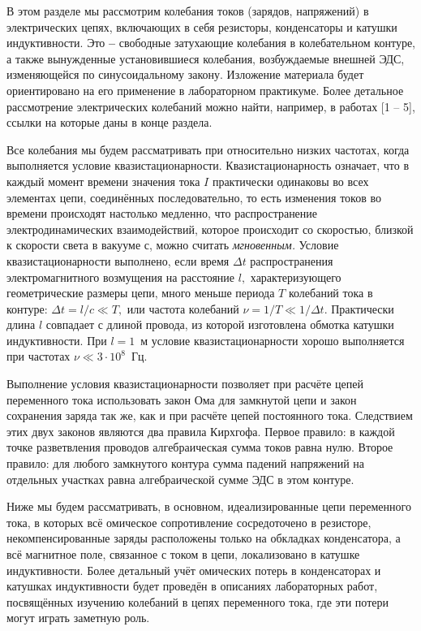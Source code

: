 В этом разделе мы рассмотрим колебания токов (зарядов, напряжений) в электрических цепях, включающих в себя резисторы, конденсаторы и катушки индуктивности. Это \textbf{--} свободные затухающие колебания в колебательном контуре, а также вынужденные установившиеся колебания, возбуждаемые внешней ЭДС, изменяющейся по синусоидальному закону. Изложение материала будет ориентировано на его применение в лабораторном практикуме. Более детальное рассмотрение электрических колебаний можно найти, например, в работах [1 – 5], ссылки на которые даны в конце раздела.

Все колебания мы будем рассматривать при относительно низких частотах, когда выполняется условие квазистационарности. Квазистационарность означает, что в каждый момент времени значения тока $I$ практически одинаковы во всех элементах цепи, соединённых последовательно, то есть изменения токов во времени происходят настолько медленно, что распространение электродинамических взаимодействий, которое происходит со скоростью, близкой к скорости света в вакууме $с$, можно считать \emph{мгновенным.} Условие квазистационарности выполнено, если время $\Delta t$ распространения электромагнитного возмущения на расстояние $l,$ характеризующего геометрические размеры цепи, много меньше периода $T$ колебаний тока в контуре: $\Delta t=l/c\ll T,$ или частота колебаний $\nu=1/T\ll1/\Delta t.$ Практически длина $l$ совпадает с длиной провода, из которой изготовлена обмотка катушки индуктивности. При $l=1$~м условие квазистационарности хорошо выполняется при частотах $\nu\ll3\cdot10^8$~Гц.

Выполнение условия квазистационарности позволяет при расчёте цепей переменного тока использовать закон Ома для замкнутой цепи и закон сохранения заряда так же, как и при расчёте цепей постоянного тока. Следствием этих двух законов являются два правила Кирхгофа. Первое правило: в каждой точке разветвления проводов алгебраическая сумма токов равна нулю. Второе правило: для любого замкнутого контура сумма падений напряжений на отдельных участках равна алгебраической сумме ЭДС в этом контуре. 

Ниже мы будем рассматривать, в основном, идеализированные цепи переменного тока, в которых всё омическое сопротивление сосредоточено в резисторе, некомпенсированные заряды расположены только на обкладках конденсатора, а всё магнитное поле, связанное с током в цепи, локализовано в катушке индуктивности. Более детальный учёт омических потерь в конденсаторах и катушках индуктивности будет проведён в описаниях лабораторных работ, посвящённых изучению колебаний в цепях переменного тока, где эти потери могут играть заметную роль.

